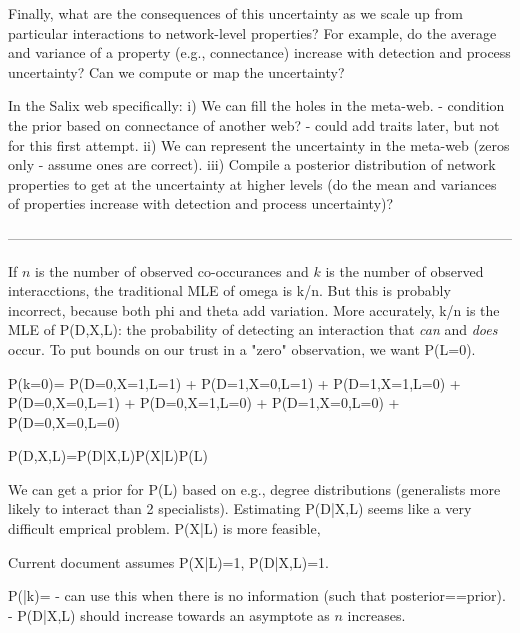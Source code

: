 Finally, what are the consequences of this uncertainty as we scale up from particular interactions to network-level properties? For example, do the average and variance of a property (e.g., connectance) increase with detection and process uncertainty? Can we compute or map the uncertainty?

In the Salix web specifically:
  i) We can fill the holes in the meta-web.
      - condition the prior based on connectance of another web? - could add traits later, but not for this first attempt.
  ii) We can represent the uncertainty in the meta-web (zeros only - assume ones are correct).
  iii) Compile a posterior distribution of network properties to get at the uncertainty at higher levels (do the mean and variances of properties increase with detection and process uncertainty)?



------------------------------------------------------------------------------------------------------------

If $n$ is the number of observed co-occurances and $k$ is the number of observed interacctions, the traditional MLE of omega is k/n. But this is probably incorrect, because both phi and theta add variation. More accurately, k/n is the MLE of P(D,X,L): the probability of detecting an interaction that \emph{can} and \emph{does} occur. To put bounds on our trust in a "zero" observation, we want P(L=0).

P(k=0)= P(D=0,X=1,L=1) %
          + P(D=1,X=0,L=1) %
          + P(D=1,X=1,L=0) %
          + P(D=0,X=0,L=1) %
          + P(D=0,X=1,L=0) %
          + P(D=1,X=0,L=0) %
          + P(D=0,X=0,L=0) %


P(D,X,L)=P(D|X,L)P(X|L)P(L)

We can get a prior for P(L) based on e.g., degree distributions (generalists more likely to interact than 2 specialists). Estimating P(D|X,L) seems like a very difficult emprical problem. P(X|L) is more feasible, 

Current document assumes P(X|L)=1, P(D|X,L)=1.

P(\omega|k)=
- can use this when there is no information (such that posterior==prior).
- P(D|X,L) should increase towards an asymptote as $n$ increases.






